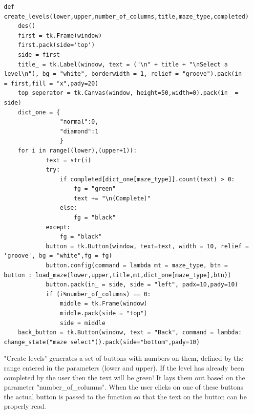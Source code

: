 \documentclass{article}
\begin{document}
\begin{lstlisting}
def create_levels(lower,upper,number_of_columns,title,maze_type,completed):
    des()
    first = tk.Frame(window)
    first.pack(side='top')
    side = first
    title_ = tk.Label(window, text = ("\n" + title + "\nSelect a level\n"), bg = "white", borderwidth = 1, relief = "groove").pack(in_ = first,fill = "x",pady=20)
    top_seperator = tk.Canvas(window, height=50,width=0).pack(in_ = side)
    dict_one = {
                "normal":0,
                "diamond":1
                }
    for i in range((lower),(upper+1)):
            text = str(i)                          
            try:
                if completed[dict_one[maze_type]].count(text) > 0:
                    fg = "green"
                    text += "\n(Complete)"
                else:
                    fg = "black"
            except:
                fg = "black"
            button = tk.Button(window, text=text, width = 10, relief = 'groove', bg = "white",fg = fg)
            button.config(command = lambda mt = maze_type, btn = button : load_maze(lower,upper,title,mt,dict_one[maze_type],btn))
            button.pack(in_ = side, side = "left", padx=10,pady=10)
            if (i%number_of_columns) == 0:
                middle = tk.Frame(window)
                middle.pack(side = "top")
                side = middle
    back_button = tk.Button(window, text = "Back", command = lambda: change_state("maze select")).pack(side="bottom",pady=10)

\end{lstlisting}
"Create levels" generates a set of buttons with numbers on them, defined by the range entered in the parameters (lower and upper). If the level has already been completed by the user then the text will be green! It lays them out based on the parameter "number\_of\_columns".
When the user clicks on one of these buttons the actual button is passed to the function so that the text on the button can be properly read.

\clearpage
\end{document}
